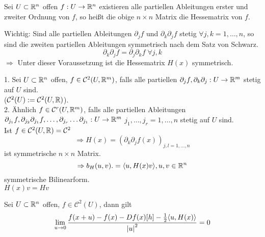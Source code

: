 \documentclass[../ana2.tex]{subfiles}
\begin{document}
\begin{defi}
    Sei \(U \subset \mathbb{R}^n\) offen \(f:U\rightarrow \mathbb{R}^n\) existieren alle partiellen Ableitungen
    erster und zweiter Ordnung von \(f\), so heißt die obige \(n\times n\) Matrix die Hessematrix 
    von \(f\).
\end{defi}
Wichtig: Sind alle partiellen Ableitungen \(\partial_j f\) und 
\( \partial_k \partial_j f \)
stetig \(\forall j,k = 1, \ldots , n\), so sind die zweiten partiellen Ableitungen symmetrisch
nach dem Satz von Schwarz.
\[ \partial_k \partial_j f = \partial_j \partial_k f \; \forall j,k \]
\(\Rightarrow\) Unter dieser Voraussetzung ist die Hessematrix \(H(x)\) symmetrisch.
\begin{defi}
    1. Sei \(U \subset \mathbb{R}^n\) offen, 
    \(f \in \mathcal{C}^2(U, \mathbb{R}^m)\), falls alle
    partiellen \(\partial_jf, \partial_k \partial_j:U\rightarrow \mathbb{R}^m\) stetig auf \(U\) sind.\\
    (\( \mathcal{C}^2(U) := \mathcal{C}^2(U, \mathbb{R}) \)).\\
    2. Ähnlich \(f \in \mathcal{C}^r(U, \mathbb{R}^m)\), 
    falls alle partiellen Ableitungen
    \( \partial_{j_1}f, \partial_{j_2}\partial_{j_1}f, \ldots, 
    \partial_{j_r}\ldots \partial_{j_1}:U\rightarrow \mathbb{R}^m \)
    \( j_1, \ldots, j_r = 1, \ldots, n \) stetig auf \(U\) sind.\\
    Ist \(f \in \mathcal{C}^2(U,\mathbb{R}) = \mathcal{C}^2\)
    \[ \Rightarrow H(x) = (\partial_k \partial_j f(x))_{j,l 
    = 1,\ldots, n} \]
    ist symmetrische \(n\times n \) Matrix.
    \[ \Rightarrow b_H(u,v) .= \langle u, H(x)v \rangle, u,v \in \mathbb{R}^n \]
    symmetrische Bilinearform.\\
    \( H(x)v = H v \)
\end{defi}
\begin{lem}
    Sei \(U \subset \mathbb{R}^n\) offen, \(f \in \mathcal{C}^2(U)\), 
    dann gilt
    \[ \lim\limits_{u\rightarrow{}0} \frac{f(x+u) - f(x) - Df(x)[h] - \frac{1}{2} 
    \langle u, H(x) \rangle}{\left|u\right|^2} = 0 \]
\end{lem}
\end{document}
